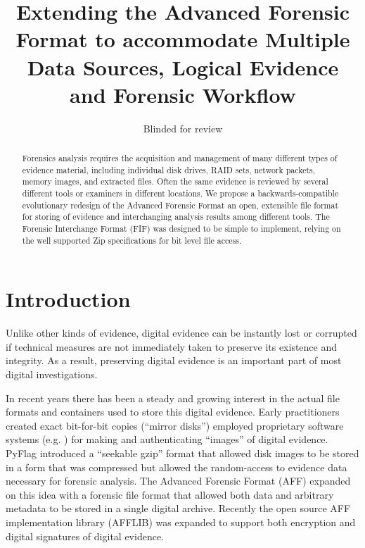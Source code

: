 \documentclass[10pt, conference]{IEEEtran}
\begin{document}
\title{Extending the Advanced Forensic Format to accommodate Multiple
  Data Sources, Logical Evidence and Forensic Workflow}
\author{Blinded for review}
\maketitle

\begin{abstract}
Forensics analysis requires the acquisition and management of many
different types of evidence material, including individual disk
drives, RAID sets, network packets, memory images, and extracted files. Often the same evidence is
reviewed by several different tools or examiners in different
locations. We propose a backwards-compatible evolutionary redesign of the Advanced
Forensic Format an open, extensible
file format for storing of evidence and interchanging analysis results
among different tools. The Forensic Interchange Format (FIF) was
designed to be simple to implement, relying on the well supported Zip
specifications for bit level file access.
\end{abstract}

\section{Introduction}

Unlike other kinds of evidence, digital evidence can be instantly lost
or corrupted if technical measures are not immediately taken to
preserve its existence and integrity. As a result, preserving digital
evidence is an important part of most digital
investigations\cite{carrier:event-based}.

In recent years there has been a steady and growing interest in the
actual file formats and containers used to store this digital
evidence. Early practitioners created exact bit-for-bit copies (``mirror disks'') employed
proprietary software systems (e.g. \cite{safeback,ilook,encase}) for
making and authenticating ``images'' of digital evidence. PyFlag\cite{pyflag}
introduced a ``seekable gzip'' format that allowed disk images to be
stored in a form that was compressed but allowed the random-access to
evidence data necessary for forensic analysis. The Advanced Forensic
Format (AFF) expanded on this idea with a forensic file format that
allowed both data and arbitrary metadata to be stored in a single
digital archive\cite{garfinkel:aff}. Recently the open source AFF
implementation library (AFFLIB) was expanded to support both
encryption and digital signatures of digital evidence\cite{garfinkel:affcrypto}.
\end{document}
